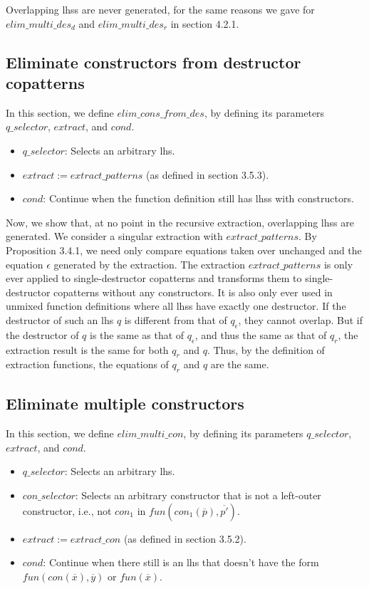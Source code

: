 Overlapping lhss are never generated, for the same reasons we gave for $elim\_multi\_des_d$ and $elim\_multi\_des_r$ in section 4.2.1.

\subsection{Eliminate constructors from destructor copatterns}

In this section, we define $elim\_cons\_from\_des$, by defining its parameters $q\_selector$, $extract$, and $cond$.

\begin{itemize}
\item $q\_selector$: Selects an arbitrary lhs.

\item $extract := extract\_patterns$ (as defined in section 3.5.3).

\item $cond$: Continue when the function definition still has lhss with constructors.
\end{itemize}

Now, we show that, at no point in the recursive extraction, overlapping lhss are generated. We consider a singular extraction with $extract\_patterns$. By Proposition 3.4.1, we need only compare equations taken over unchanged and the equation $\epsilon$ generated by the extraction. The extraction $extract\_patterns$ is only ever applied to single-destructor copatterns and transforms them to single-destructor copatterns without any constructors. It is also only ever used in unmixed function definitions where all lhss have exactly one destructor. If the destructor of such an lhs $q$ is different from that of $q_\epsilon$, they cannot overlap. But if the destructor of $q$ is the same as that of $q_\epsilon$, and thus the same as that of $q_r$, the extraction result is the same for both $q_r$ and $q$. Thus, by the definition of extraction functions, the equations of $q_r$ and $q$ are the same.

\subsection{Eliminate multiple constructors}

In this section, we define $elim\_multi\_con$, by defining its parameters $q\_selector$, $extract$, and $cond$.

\begin{itemize}
\item $q\_selector$: Selects an arbitrary lhs.

\item $con\_selector$: Selects an arbitrary constructor that is not a left-outer constructor, i.e., not $con_1$ in $fun(con_1(\overline{p}), \overline{p'})$.

\item $extract := extract\_con$ (as defined in section 3.5.2).

\item $cond$: Continue when there still is an lhs that doesn't have the form $fun(con(\overline{x}), \overline{y})$ or $fun(\overline{x})$.
\end{itemize}

